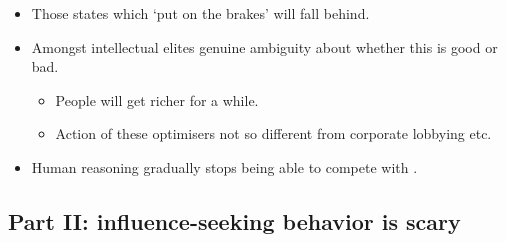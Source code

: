 \begin{itemize}
\begin{itemize}
    \end{itemize}
    \item Those states which `put on the brakes' will fall behind.
    \pagebreak
    \item Amongst intellectual elites genuine ambiguity about whether this is good or bad.
    \begin{itemize}
        \item People will get richer for a while.
        \item Action of these optimisers not so different from corporate lobbying etc.
    \end{itemize}
    \item Human reasoning gradually stops being able to compete with . 
\end{itemize}


\subsection{Part II: influence-seeking behavior is scary}

